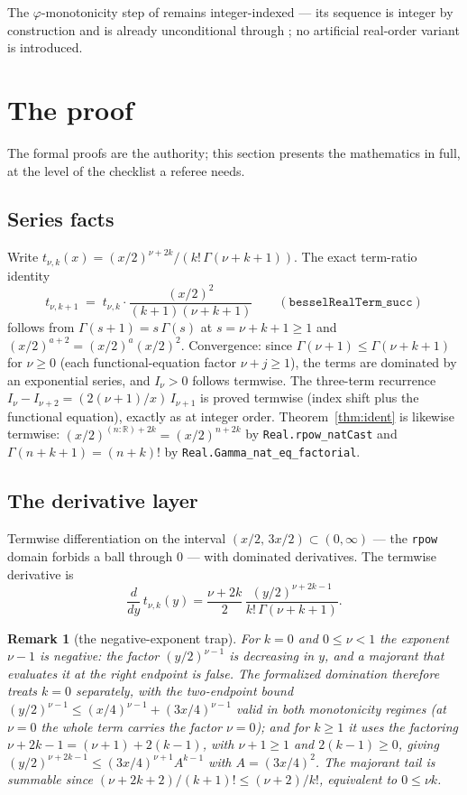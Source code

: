 \documentclass[11pt]{article}
\newtheorem{remark}[theorem]{Remark}
\newcommand{\lean}[1]{\texttt{#1}}
\begin{document}
The $\varphi$-monotonicity step of \cite{ErikssonC2} remains
integer-indexed --- its sequence is integer by construction and is
already unconditional through \cite{ErikssonC3}; no artificial
real-order variant is introduced.

\section{The proof}\label{sec:proof}

The formal proofs are the authority; this section presents the
mathematics in full, at the level of the checklist a referee needs.

\subsection{Series facts}\label{sec:series}

Write $t_{\nu,k}(x) = (x/2)^{\nu+2k}/(k!\,\Gamma(\nu+k+1))$.  The
exact term-ratio identity
\[
t_{\nu,k+1} \;=\; t_{\nu,k}\cdot
\frac{(x/2)^2}{(k+1)(\nu+k+1)}
\qquad (\lean{besselRealTerm\_succ})
\]
follows from $\Gamma(s+1) = s\,\Gamma(s)$ at $s = \nu+k+1 \ge 1$ and
$(x/2)^{a+2} = (x/2)^a(x/2)^2$.  Convergence: since
$\Gamma(\nu+1) \le \Gamma(\nu+k+1)$ for $\nu \ge 0$ (each
functional-equation factor $\nu+j \ge 1$), the terms are dominated
by an exponential series, and $I_\nu > 0$ follows termwise.  The
three-term recurrence
$I_\nu - I_{\nu+2} = (2(\nu+1)/x)\,I_{\nu+1}$ is proved termwise
(index shift plus the functional equation), exactly as at integer
order.  Theorem~\ref{thm:ident} is likewise termwise:
$(x/2)^{(n:\mathbb{R})+2k} = (x/2)^{n+2k}$ by
\lean{Real.rpow\_natCast} and
$\Gamma(n+k+1) = (n+k)!$ by \lean{Real.Gamma\_nat\_eq\_factorial}.

\subsection{The derivative layer}\label{sec:deriv}

Termwise differentiation on the interval
$(x/2,\,3x/2) \subset (0,\infty)$ --- the \lean{rpow} domain forbids
a ball through $0$ --- with dominated derivatives.  The termwise
derivative is
\[
\frac{d}{dy}\, t_{\nu,k}(y)
= \frac{\nu+2k}{2}\,
\frac{(y/2)^{\nu+2k-1}}{k!\,\Gamma(\nu+k+1)} .
\]

\begin{remark}[the negative-exponent trap]\label{rem:negexp}
For $k = 0$ and $0 \le \nu < 1$ the exponent $\nu-1$ is negative:
the factor $(y/2)^{\nu-1}$ is \emph{decreasing} in $y$, and a
majorant that evaluates it at the right endpoint is false.  The
formalized domination therefore treats $k=0$ separately, with the
two-endpoint bound
$(y/2)^{\nu-1} \le (x/4)^{\nu-1} + (3x/4)^{\nu-1}$ valid in both
monotonicity regimes (at $\nu = 0$ the whole term carries the factor
$\nu = 0$); and for $k \ge 1$ it uses the factoring
$\nu+2k-1 = (\nu+1) + 2(k-1)$, with $\nu+1 \ge 1$ and
$2(k-1) \ge 0$, giving
$(y/2)^{\nu+2k-1} \le (3x/4)^{\nu+1} A^{k-1}$ with $A = (3x/4)^2$.
The majorant tail is summable since
$(\nu+2k+2)/(k+1)! \le (\nu+2)/k!$, equivalent to $0 \le \nu k$.
\end{remark}
\end{document}

